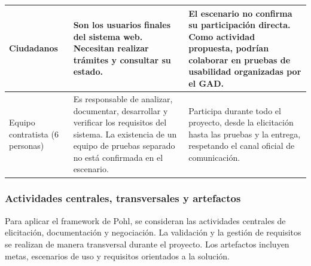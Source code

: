 \documentclass[12pt,a4paper]{article}
\renewcommand{\arraystretch}{1.3}
\begin{document}
\begin{longtable}{
>{\raggedright\arraybackslash}p{3.0cm}
>{\raggedright\arraybackslash}p{5.2cm}
>{\raggedright\arraybackslash}p{6.7cm}
}
Ciudadanos &
Son los usuarios finales del sistema web.
Necesitan realizar trámites y consultar su estado. &
El escenario no confirma su participación directa.
Como actividad propuesta, podrían colaborar
en pruebas de usabilidad organizadas por el GAD. \\
\midrule

Equipo contratista (6 personas) &
Es responsable de analizar, documentar,
desarrollar y verificar los requisitos del sistema.
La existencia de un equipo de pruebas separado
no está confirmada en el escenario. &
Participa durante todo el proyecto, desde
la elicitación hasta las pruebas y la entrega,
respetando el canal oficial de comunicación. \\

\bottomrule
\end{longtable}
\endgroup


\subsubsection{Actividades centrales, transversales y artefactos}

Para aplicar el framework de Pohl, se consideran
las actividades centrales de elicitación, documentación
y negociación. La validación y la gestión de requisitos
se realizan de manera transversal durante el proyecto.
Los artefactos incluyen metas, escenarios de uso
y requisitos orientados a la solución.

\begingroup
\scriptsize
\setlength{\tabcolsep}{3pt}
\renewcommand{\arraystretch}{1.1}
\end{document}
